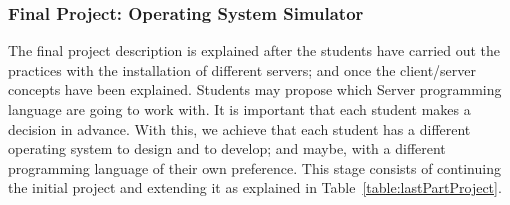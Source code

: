 \subsubsection{Final Project: Operating System Simulator}
\label{sssec:finalProyDesc}
The final project description is explained after the students have carried out 
the practices with the installation of different servers; and once the client/server 
concepts have been explained. 
Students may propose which Server programming language are going to work with. 
It is important that each student makes a decision in advance. 
With this, we achieve that each student has a different operating system to design and
to develop; and maybe, with a different programming language of their own preference.
This stage consists of continuing the initial project 
and extending it as explained in Table~\ref{table:lastPartProject}.
